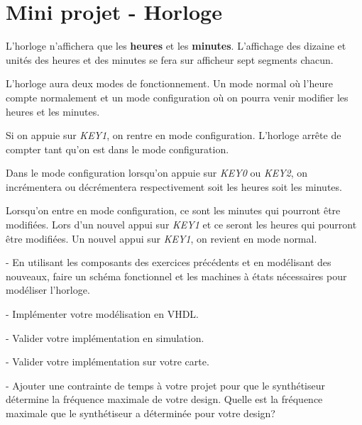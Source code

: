 \section{Mini projet - Horloge}

L'horloge n'affichera que les \textbf{heures} et les \textbf{minutes}. L'affichage des dizaine et unités des heures et des minutes se fera sur afficheur sept segments chacun.

\medskip

L'horloge aura deux modes de fonctionnement. Un mode normal où l'heure compte normalement et un mode configuration où on pourra venir modifier les heures et les minutes.

\medskip
Si on appuie sur \textit{KEY1}, on rentre en mode configuration. L'horloge arrête de compter tant qu'on est dans le mode configuration.

\medskip

Dans le mode configuration lorsqu'on appuie sur \textit{KEY0} ou \textit{KEY2}, on incrémentera ou décrémentera respectivement soit les heures soit les minutes.

\medskip

Lorsqu'on entre en mode configuration, ce sont les minutes qui pourront être modifiées. Lors d'un nouvel appui sur \textit{KEY1} et ce seront les heures qui pourront être modifiées. Un nouvel appui sur \textit{KEY1}, on revient en mode normal.

\medskip

- En utilisant les composants des exercices précédents et en modélisant des nouveaux, faire un schéma fonctionnel et les machines à états nécessaires pour modéliser l'horloge.

\medskip

- Implémenter votre modélisation en VHDL.

\medskip

- Valider votre implémentation en simulation.

\medskip

- Valider votre implémentation sur votre carte.

\medskip

- Ajouter une contrainte de temps à votre projet pour que le synthétiseur détermine la fréquence maximale de votre design. Quelle est la fréquence maximale que le synthétiseur a déterminée pour votre design?
